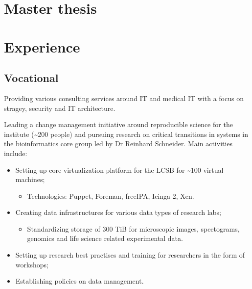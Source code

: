 \documentclass[11pt,a4paper,nolmodern, sans]{moderncv}        %
\begin{document}

\section{Master thesis}


\section{Experience}
\subsection{Vocational}


{Providing various consulting services around IT and medical IT with a focus on stragey, security and IT architecture.}


{Leading a change management initiative around reproducible science for the institute (\textasciitilde 200 people) and pursuing research on critical transitions in systems in the bioinformatics core group led by Dr Reinhard Schneider. \newline{} Main activities include:
\begin{itemize}
	\item Setting up core virtualization platform for the LCSB for \textasciitilde 100 virtual machines;
	\begin{itemize}
		\item Technologies: Puppet, Foreman, freeIPA, Icinga 2, Xen.
	\end{itemize}
	\item Creating data infrastructures for various data types of research labs;
  \begin{itemize}
		\item Standardizing storage of 300 TiB for microscopic images, spectograms, genomics and life science related experimental data.
	\end{itemize}
	\item Setting up research best practises and training for researchers in the form of workshops;
	\item Establishing policies on data management.
\end{itemize}}
\end{document}
